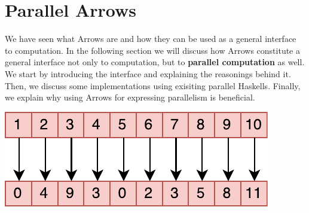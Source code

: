 \section{Parallel Arrows}
\label{sec:parallel-arrows}
We have seen what Arrows are and how they can be used as a general interface to computation. In the following section we will discuss how Arrows constitute a general interface not only to computation, but to \textbf{parallel computation} as well. We start by introducing the interface and explaining the reasonings behind it. Then, we discuss some implementations using exisiting parallel Haskells. Finally, we explain why using Arrows for expressing parallelism is beneficial.
\begin{center}
	\includegraphics[scale=0.7]{images/parEvalN}
\end{center}
